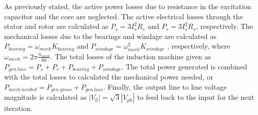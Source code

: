As previously stated, the active power losses due to resistance in the excitation capacitor and the core are neglected. The active electrical losses through the stator and rotor are calculated as $P_s = 3 I_s^2 R_s$ and $P_r = 3 I_s^2 R_s$, respectively. The mechanical losses due to the bearings and windage are calculated as $P_{bearing} = \omega_{mech} K_{bearing}$ \cite{pyrhonen2013design} and $P_{windage} = \omega_{mech}^2 K_{windage}$ \cite{Vrancik1968}, respectively, where $\omega_{mech} = 2 \pi \frac{n_{mech}}{60}$. The total losses of the induction machine given as $P_{gen\ loss} = P_s + P_r + P_{bearing} + P_{windage}$. The total power generated is combined with the total losses to calculated the mechanical power needed, or $P_{mech\ needed} = P_{gen\ gross} + P_{gen\ loss}$. Finally, the output line to line voltage magnitude is calculated as $\left|V_{ll}\right| = \sqrt{3}\left|V_{ph}\right|$ to feed back to the input for the next iteration.

